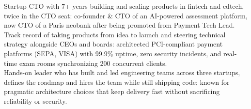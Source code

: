 \vspace{0.2cm}


\begin{minipage}[t]{1\textwidth}
    \vspace{-\baselineskip}
    Startup CTO with 7+ years building and scaling products in fintech and edtech, twice in the CTO seat: co-founder \& CTO of an AI-powered assessment platform, now CTO of a Paris neobank after being promoted from Payment Tech Lead. \\
    Track record of taking products from idea to launch and steering technical strategy alongside CEOs and boards: architected PCI-compliant payment platforms (SEPA, VISA) with 99.9\% uptime, zero security incidents, and real-time exam rooms synchronizing 200 concurrent clients. \\
    Hands-on leader who has built and led engineering teams across three startups, defines the roadmap and hires the team while still shipping code; known for pragmatic architecture choices that keep delivery fast without sacrificing reliability or security.
\end{minipage}
